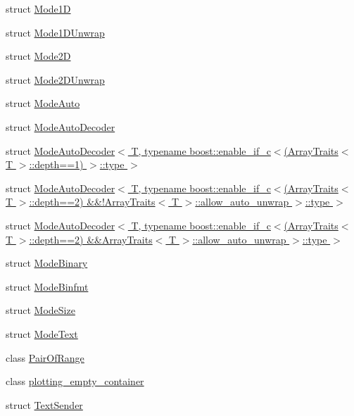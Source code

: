 \begin{DoxyCompactItemize}
\item 
struct \hyperlink{structgnuplotio_1_1_mode1_d}{Mode1D}
\item 
struct \hyperlink{structgnuplotio_1_1_mode1_d_unwrap}{Mode1\+D\+Unwrap}
\item 
struct \hyperlink{structgnuplotio_1_1_mode2_d}{Mode2D}
\item 
struct \hyperlink{structgnuplotio_1_1_mode2_d_unwrap}{Mode2\+D\+Unwrap}
\item 
struct \hyperlink{structgnuplotio_1_1_mode_auto}{Mode\+Auto}
\item 
struct \hyperlink{structgnuplotio_1_1_mode_auto_decoder}{Mode\+Auto\+Decoder}
\item 
struct \hyperlink{structgnuplotio_1_1_mode_auto_decoder_3_01_t_00_01typename_01boost_1_1enable__if__c_3_07_array_t1ec50a546e6580c42fe67da3e27f4154}{Mode\+Auto\+Decoder$<$ T, typename boost\+::enable\+\_\+if\+\_\+c$<$(\+Array\+Traits$<$ T $>$\+::depth==1) $>$\+::type $>$}
\item 
struct \hyperlink{structgnuplotio_1_1_mode_auto_decoder_3_01_t_00_01typename_01boost_1_1enable__if__c_3_07_array_t40de9ad20cf29b501e884c0f76d7ac36}{Mode\+Auto\+Decoder$<$ T, typename boost\+::enable\+\_\+if\+\_\+c$<$(\+Array\+Traits$<$ T $>$\+::depth==2) \&\&!\+Array\+Traits$<$ T $>$\+::allow\+\_\+auto\+\_\+unwrap $>$\+::type $>$}
\item 
struct \hyperlink{structgnuplotio_1_1_mode_auto_decoder_3_01_t_00_01typename_01boost_1_1enable__if__c_3_07_array_t4ce8ac95d6c3a0ceeea993ff675b3872}{Mode\+Auto\+Decoder$<$ T, typename boost\+::enable\+\_\+if\+\_\+c$<$(\+Array\+Traits$<$ T $>$\+::depth==2) \&\&\+Array\+Traits$<$ T $>$\+::allow\+\_\+auto\+\_\+unwrap $>$\+::type $>$}
\item 
struct \hyperlink{structgnuplotio_1_1_mode_binary}{Mode\+Binary}
\item 
struct \hyperlink{structgnuplotio_1_1_mode_binfmt}{Mode\+Binfmt}
\item 
struct \hyperlink{structgnuplotio_1_1_mode_size}{Mode\+Size}
\item 
struct \hyperlink{structgnuplotio_1_1_mode_text}{Mode\+Text}
\item 
class \hyperlink{classgnuplotio_1_1_pair_of_range}{Pair\+Of\+Range}
\item 
class \hyperlink{classgnuplotio_1_1plotting__empty__container}{plotting\+\_\+empty\+\_\+container}
\item 
struct \hyperlink{structgnuplotio_1_1_text_sender}{Text\+Sender}
\item 

\end{DoxyCompactItemize}
